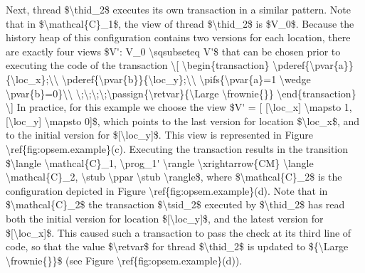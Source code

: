\ac{
Next, thread $\thid_2$ executes its own transaction in a similar pattern. 
Note that in $\mathcal{C}_1$, the view of thread $\thid_2$ is $V_0$. Because 
the history heap of this configuration contains two versions for each location, 
there are exactly four views $V': V_0 \sqsubseteq V'$ that can be chosen 
prior to executing the code of the transaction 
\[
              \begin{transaction}
            		\pderef{\pvar{a}}{\loc_x};\\
            		\pderef{\pvar{b}}{\loc_y};\\
            		\pifs{\pvar{a}=1 \wedge \pvar{b}=0}\\
            			\;\;\;\;\passign{\retvar}{\Large \frownie{}}
             \end{transaction}
\]

In practice, for this example we choose the view $V' = [ [\loc_x] \mapsto 1, [\loc_y] \mapsto 0]$, 
which points to the last version for location $\loc_x$, and to the initial version for $[\loc_y]$. 
This view is represented in Figure \ref{fig:opsem.example}(c). Executing the transaction 
results in the transition $\langle \mathcal{C}_1, \prog_1' \rangle \xrightarrow{CM} \langle \mathcal{C}_2, \stub \ppar \stub \rangle$, 
where $\mathcal{C}_2$ is the configuration depicted in Figure \ref{fig:opsem.example}(d). 
Note that in $\mathcal{C}_2$ the transaction $\tsid_2$ executed by $\thid_2$ has 
read both the initial version for location $[\loc_y]$, and the latest version for $[\loc_x]$. 
This caused such a transaction to pass the check at its third line of code, so that the value $\retvar$ 
for thread $\thid_2$ is updated to ${\Large \frownie{}}$ (see Figure \ref{fig:opsem.example}(d)).
}

